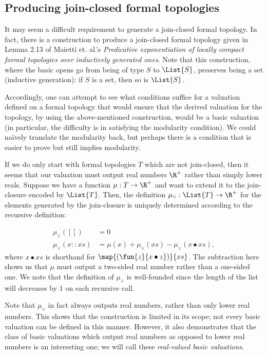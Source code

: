 \subsection{Producing join-closed formal topologies}

It may seem a difficult requirement to generate a join-closed formal topology. In fact, there is a construction to produce a join-closed formal topology given in Lemma 2.13 of Maietti et. al.'s \emph{Predicative exponentiation of locally compact formal topologies over inductively generated ones}. Note that this construction, where the basic opens go from being of type $S$ to $\List{S}$, preserves being a set (inductive generation): if $S$ is a set, then so is $\List{S}$.

Accordingly, one can attempt to see what conditions suffice for a valuation defined on a formal topology that would ensure that the derived valuation for the topology, by using the above-mentioned construction, would be a basic valuation (in particular, the difficulty is in satisfying the modularity condition). We could na\"ively translate the modularity back, but perhaps there is a condition that is easier to prove but still implies modularity.


If we do only start with formal topologies $T$ which are not join-closed, then it seems that our valuation must output real numbers $\R^+$ rather than simply lower reals. Suppose we have a function $\mu : T \to \R^+$ and want to extend it to the join-closure encoded by $\List{T}$. Then, the definition $\mu_\vee : \List{T} \to \R^+$ for the elements generated by the join-closure is uniquely determined according to the recursive definition:

\begin{align*}
\mu_\vee([]) &= 0
\\ \mu_\vee(x :: xs) &= \mu(x) + \mu_\vee(xs) - \mu_\vee(x \bullet xs),
\end{align*}
where $x \bullet xs$ is shorthand for $\map{(\fun{z}{x \bullet z})}{xs}$. The subtraction here shows us that $\mu$ must output a two-sided real number rather than a one-sided one. We note that the definition of $\mu_\vee$ is well-founded since the length of the list will decreases by 1 on each recursive call.

Note that $\mu_\vee$ in fact always outputs real numbers, rather than only lower real numbers. This shows that the construction is limited in its scope; not every basic valuation can be defined in this manner. However, it also demonstrates that the class of basic valuations which output real numbers as opposed to lower real numbers is an interesting one; we will call these \emph{real-valued basic valuations}.


